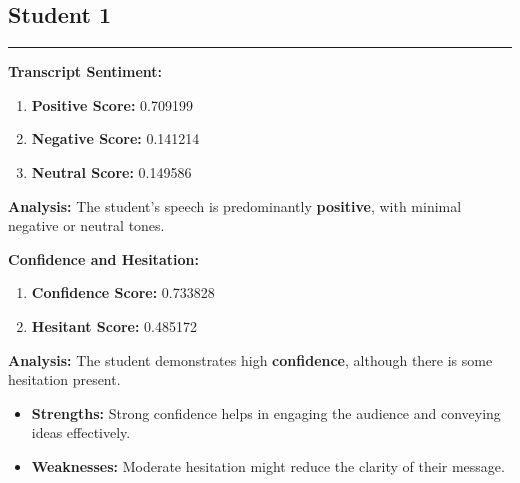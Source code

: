 \documentclass{article}
\begin{document}
\subsection{Student 1}
\begin{center}
    \color{green}\rule{1\linewidth}{0.7mm}
\end{center}
    \large{\textbf{Transcript Sentiment:}}
    \begin{tcolorbox}[ colback=purple!5!white,colframe=purple!75!black,   fonttitle=\bfseries, title=Sentiment Breakdown]
        \begin{enumerate}
            \item \textbf{Positive Score:} \textcolor{green!70!black}{0.709199}
            \item \textbf{Negative Score:} \textcolor{red!70!black}{0.141214}
            \item \textbf{Neutral Score:} \textcolor{blue!70!black}{0.149586}
        \end{enumerate}
    \end{tcolorbox}
        \textbf{Analysis:} The student's speech is predominantly \textbf{positive}, with minimal negative or neutral tones.

    \large{\textbf{Confidence and Hesitation:}}
    \begin{tcolorbox}[colback=green!10!white, colframe=green!80!black, title=Confidence and Hesitant Scores]
        \begin{enumerate}
            \item \textbf{Confidence Score:} \textcolor{green!50!black}{0.733828}
            \item \textbf{Hesitant Score:} \textcolor{red!70!black}{0.485172}
        \end{enumerate}
        \textbf{Analysis:} The student demonstrates high \textbf{confidence}, although there is some hesitation present.
        \begin{itemize}
            \item \textbf{Strengths:} Strong confidence helps in engaging the audience and conveying ideas effectively.
            \item \textbf{Weaknesses:} Moderate hesitation might reduce the clarity of their message.
        \end{itemize}
    \end{tcolorbox}
\end{document}

